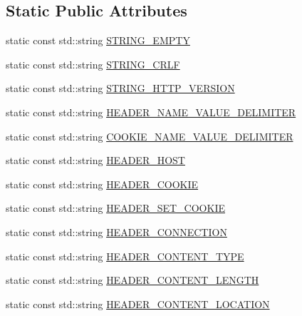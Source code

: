 \subsection*{Static Public Attributes}
\begin{DoxyCompactItemize}
\item 
static const std\-::string \hyperlink{structpion_1_1http_1_1types_ac329dd732e03e0a0b1651a84d629280d}{S\-T\-R\-I\-N\-G\-\_\-\-E\-M\-P\-T\-Y}
\item 
static const std\-::string \hyperlink{structpion_1_1http_1_1types_a2716c2eefa7527fd8e342f82cc45f1b8}{S\-T\-R\-I\-N\-G\-\_\-\-C\-R\-L\-F}
\item 
static const std\-::string \hyperlink{structpion_1_1http_1_1types_a432751abff7daf4f043a8f48a0a9e326}{S\-T\-R\-I\-N\-G\-\_\-\-H\-T\-T\-P\-\_\-\-V\-E\-R\-S\-I\-O\-N}
\item 
static const std\-::string \hyperlink{structpion_1_1http_1_1types_a483a9875308673605d6f9e826a374970}{H\-E\-A\-D\-E\-R\-\_\-\-N\-A\-M\-E\-\_\-\-V\-A\-L\-U\-E\-\_\-\-D\-E\-L\-I\-M\-I\-T\-E\-R}
\item 
static const std\-::string \hyperlink{structpion_1_1http_1_1types_a8f2d833388e71b234d388a1f2770480a}{C\-O\-O\-K\-I\-E\-\_\-\-N\-A\-M\-E\-\_\-\-V\-A\-L\-U\-E\-\_\-\-D\-E\-L\-I\-M\-I\-T\-E\-R}
\item 
static const std\-::string \hyperlink{structpion_1_1http_1_1types_a841eb803243259e069139fa6dcd51754}{H\-E\-A\-D\-E\-R\-\_\-\-H\-O\-S\-T}
\item 
static const std\-::string \hyperlink{structpion_1_1http_1_1types_a0d1f132b8dbf10181c0d05ebaaf0ebb0}{H\-E\-A\-D\-E\-R\-\_\-\-C\-O\-O\-K\-I\-E}
\item 
static const std\-::string \hyperlink{structpion_1_1http_1_1types_a70871332398ee2aedfc481277d734a58}{H\-E\-A\-D\-E\-R\-\_\-\-S\-E\-T\-\_\-\-C\-O\-O\-K\-I\-E}
\item 
static const std\-::string \hyperlink{structpion_1_1http_1_1types_a86316d32031150a01bd2c19e92303967}{H\-E\-A\-D\-E\-R\-\_\-\-C\-O\-N\-N\-E\-C\-T\-I\-O\-N}
\item 
static const std\-::string \hyperlink{structpion_1_1http_1_1types_af5e0cb6e2855a5d0e0f46dbe177799a5}{H\-E\-A\-D\-E\-R\-\_\-\-C\-O\-N\-T\-E\-N\-T\-\_\-\-T\-Y\-P\-E}
\item 
static const std\-::string \hyperlink{structpion_1_1http_1_1types_aa942d4adb41ec6b7418615f2cf84670d}{H\-E\-A\-D\-E\-R\-\_\-\-C\-O\-N\-T\-E\-N\-T\-\_\-\-L\-E\-N\-G\-T\-H}
\item 
static const std\-::string \hyperlink{structpion_1_1http_1_1types_af5f9c5484ed5334c2cd33cfacb353288}{H\-E\-A\-D\-E\-R\-\_\-\-C\-O\-N\-T\-E\-N\-T\-\_\-\-L\-O\-C\-A\-T\-I\-O\-N}

\end{DoxyCompactItemize}
